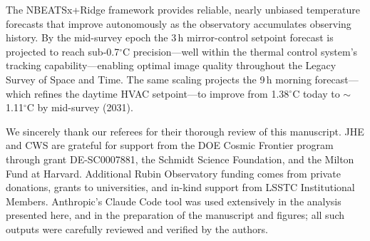 \documentclass[]{spie}  %
\newcommand{\degC}{$^{\circ}$C}
\begin{document}
The NBEATSx+Ridge framework provides reliable, nearly unbiased temperature forecasts that improve autonomously as the observatory accumulates observing history. By the mid-survey epoch the 3\,h mirror-control setpoint forecast is projected to reach sub-0.7\degC{} precision---well within the thermal control system's tracking capability---enabling optimal image quality throughout the Legacy Survey of Space and Time. The same scaling projects the 9\,h morning forecast---which refines the daytime HVAC setpoint---to improve from 1.38\degC{} today to $\sim$1.11\degC{} by mid-survey (2031).

\acknowledgments

We sincerely thank our referees for their thorough review of this manuscript.
JHE and CWS are grateful for support from the DOE Cosmic Frontier program through grant DE-SC0007881, the Schmidt Science Foundation, and the Milton Fund at Harvard. Additional Rubin Observatory funding comes from private donations, grants to universities, and in-kind support from LSSTC Institutional Members. Anthropic's Claude Code tool was used extensively in the analysis presented here, and in the preparation of the manuscript and figures; all such outputs were carefully reviewed and verified by the authors.



\end{document}
